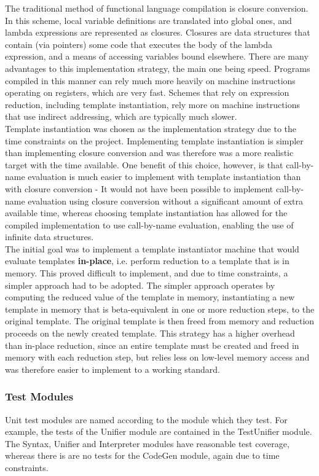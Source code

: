\documentclass{article}
\begin{document}
The traditional method of functional language compilation is closure conversion. In this scheme, local variable definitions are translated into global ones, and lambda expressions are represented as closures. Closures are data structures that contain (via pointers) some code that executes the body of the lambda expression, and a means of accessing variables bound elsewhere. There are many advantages to this implementation strategy, the main one being speed. Programs compiled in this manner can rely much more heavily on machine instructions operating on registers, which are very fast. Schemes that rely on expression reduction, including template instantiation, rely more on machine instructions that use indirect addressing, which are typically much slower.
\\\indent Template instantiation was chosen as the implementation strategy due to the time constraints on the project. Implementing template instantiation is simpler than implementing closure conversion and was therefore was a more realistic target with the time available. One benefit of this choice, however, is that call-by-name evaluation is much easier to implement with template instantiation than with closure conversion - It would not have been possible to implement call-by-name evaluation using closure conversion without a significant amount of extra available time, whereas choosing template instantiation has allowed for the compiled implementation to use call-by-name evaluation, enabling the use of infinite data structures.
\\\indent The initial goal was to implement a template instantiator machine that would evaluate templates \textbf{in-place}, i.e. perform reduction to a template that is in memory. This proved difficult to implement, and due to time constraints, a simpler approach had to be adopted. The simpler approach operates by computing the reduced value of the template in memory, instantiating a new template in memory that is beta-equivalent in one or more reduction steps, to the original template. The original template is then freed from memory and reduction proceeds on the newly created template. This strategy has a higher overhead than in-place reduction, since an entire template must be created and freed in memory with each reduction step, but relies less on low-level memory access and was therefore easier to implement to a working standard.
\subsubsection{Test Modules}
Unit test modules are named according to the module which they test. For example, the tests of the Unifier module are contained in the TestUnifier module. The Syntax, Unifier and Interpreter modules have reasonable test coverage, whereas there is are no tests for the CodeGen module, again due to time constraints.
\end{document}
